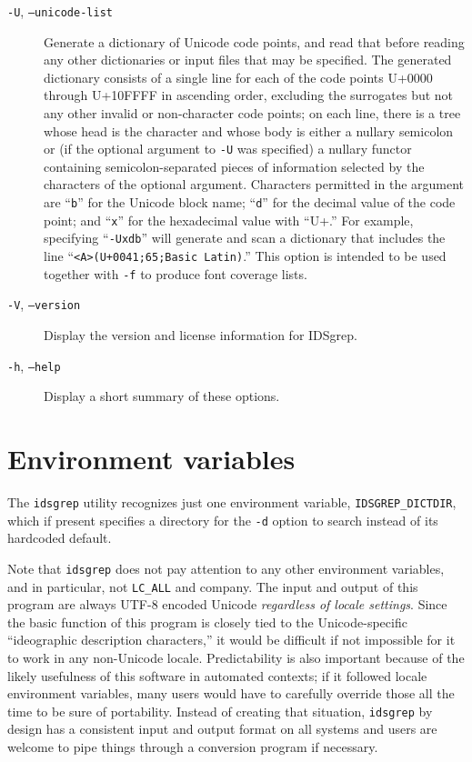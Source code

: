 \documentclass[twocolumn]{report}
\begin{document}
\begin{description}
\item[\texttt{-U}, \texttt{--unicode-list}]
Generate a dictionary of Unicode code points, and read that before
reading any other dictionaries or input files that may be specified.
The generated dictionary consists of a single line for each of the
code points U+0000 through U+10FFFF in ascending order, excluding the
surrogates but not any other invalid or non-character code points; on
each line, there is a tree whose head is the character and whose body
is either a nullary semicolon or (if the optional argument to
\texttt{-U} was specified) a nullary functor containing
semicolon-separated pieces of information selected by the characters of the
optional argument.  Characters permitted in the argument
are ``\texttt{b}'' for the Unicode block name; ``\texttt{d}'' for the
decimal value of the code point; and ``\texttt{x}'' for the
hexadecimal value with ``U+.''  For example, specifying
``\texttt{-Uxdb}'' will generate and scan a dictionary that includes
the line ``\texttt{<A>(U+0041;65;Basic Latin)}.''
This option is intended to be used together with \texttt{-f} to produce
font coverage lists.

\item[\texttt{-V}, \texttt{--version}] Display the version and license
information for IDSgrep.

\item[\texttt{-h}, \texttt{--help}] Display a short summary of these
options.

\end{description}


\section{Environment variables}

The \texttt{idsgrep} utility recognizes just one environment variable,
\texttt{IDSGREP\_DICTDIR}, which if present specifies a directory for the
\texttt{-d} option to search instead of its hardcoded default.

Note that \texttt{idsgrep} does not pay attention to any other environment
variables, and in particular, not \texttt{LC\_ALL} and company.  The input
and output of this program are always UTF-8 encoded Unicode \emph{regardless
of locale settings}.  Since the basic function of this program is closely
tied to the Unicode-specific ``ideographic description characters,'' it
would be difficult if not impossible for it to work in any non-Unicode
locale.  Predictability is also important because of the likely usefulness
of this software in automated contexts; if it followed locale environment
variables, many users would have to carefully override those all the time to
be sure of portability.  Instead of creating that situation,
\texttt{idsgrep} by design has a consistent input and output format on all
systems and users are welcome to pipe things through
a conversion program if necessary.
\end{document}
